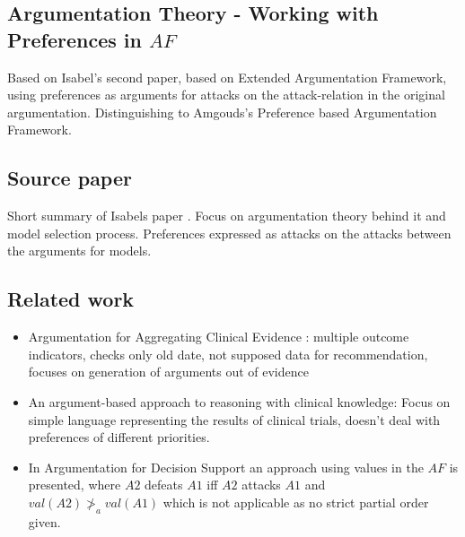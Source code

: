 \subsection{Argumentation Theory - Working with Preferences in $AF$}

Based on Isabel's second paper\cite{sassoon2016}, based on Extended Argumentation Framework\cite{Modgil2009}, using preferences as arguments for attacks on the attack-relation in the original argumentation.
Distinguishing to Amgouds's\cite{amgoud}  Preference based Argumentation Framework.

\subsection{Source paper}
Short summary of Isabels paper \cite{sassoon2014}. Focus on argumentation theory behind it and model selection process. Preferences expressed as attacks on the attacks between the arguments for models.

\subsection{Related work}
\begin{itemize}
	\item Argumentation for Aggregating Clinical Evidence \cite{hunter}: multiple outcome indicators, checks only old date, not supposed data for recommendation, focuses on generation of arguments out of evidence
	\item An argument-based approach to reasoning with clinical knowledge\cite{Gorogiannis20091}: Focus on simple language representing the results of clinical trials, doesn't deal with preferences of different priorities.

	\item In Argumentation for Decision Support\cite{Atkinson2006} an approach using values in the $AF$ is presented, where $A2$ defeats $A1$ iff $A2$ attacks $A1$ and $val(A2) \ngtr_a val(A1)$ which is not applicable as no strict partial order given.
\end{itemize}


